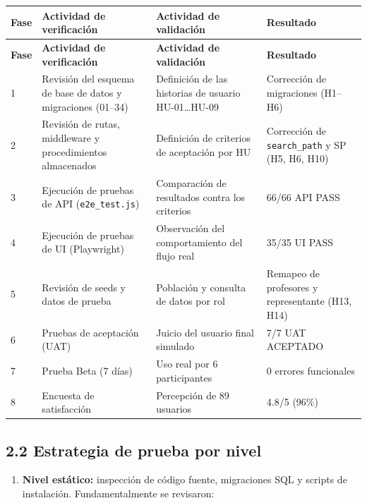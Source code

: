 \documentclass[11pt,a4paper]{article}
\begin{document}
{\small
\begin{longtable}{|p{}|p{}|p{}|p{}|}
\rowcolor{UTECblue}\color{white}\bfseries Fase & \color{white}\bfseries Actividad de verificación & \color{white}\bfseries Actividad de validación & \color{white}\bfseries Resultado \\ \hline
\endfirsthead
\rowcolor{UTECblue}\color{white}\bfseries Fase & \color{white}\bfseries Actividad de verificación & \color{white}\bfseries Actividad de validación & \color{white}\bfseries Resultado \\ \hline
\endhead
1 & Revisión del esquema de base de datos y migraciones (01--34) & Definición de las historias de usuario HU-01{\ldots}HU-09 & Corrección de migraciones (H1--H6) \\ \hline
2 & Revisión de rutas, middleware y procedimientos almacenados & Definición de criterios de aceptación por HU & Corrección de \texttt{search\_path} y SP (H5, H6, H10) \\ \hline
3 & Ejecución de pruebas de API (\texttt{e2e\_test.js}) & Comparación de resultados contra los criterios & 66/66 API PASS \\ \hline
4 & Ejecución de pruebas de UI (Playwright) & Observación del comportamiento del flujo real & 35/35 UI PASS \\ \hline
5 & Revisión de seeds y datos de prueba & Población y consulta de datos por rol & Remapeo de profesores y representante (H13, H14) \\ \hline
6 & Pruebas de aceptación (UAT) & Juicio del usuario final simulado & 7/7 UAT ACEPTADO \\ \hline
7 & Prueba Beta (7 días) & Uso real por 6 participantes & 0 errores funcionales \\ \hline
8 & Encuesta de satisfacción & Percepción de 89 usuarios & 4.8/5 (96\%) \\ \hline
\end{longtable}}


\subsection*{2.2 Estrategia de prueba por nivel}


\begin{enumerate}[leftmargin=*]
\item \textbf{Nivel estático:} inspección de código fuente, migraciones SQL y scripts de instalación. Fundamentalmente se revisaron:
\end{enumerate}
\end{document}
